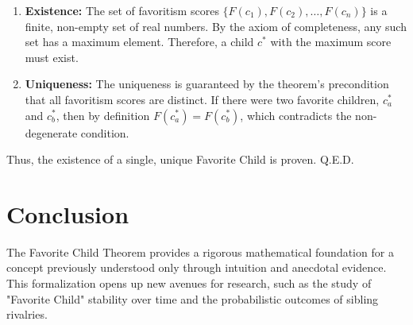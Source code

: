 \documentclass[12pt]{article}
\begin{document}
\begin{enumerate}
    \item \textbf{Existence:} The set of favoritism scores \( \{F(c_1), F(c_2), \dots, F(c_n)\} \) is a finite, non-empty set of real numbers. By the axiom of completeness, any such set has a maximum element. Therefore, a child \( c^* \) with the maximum score must exist.
    \item \textbf{Uniqueness:} The uniqueness is guaranteed by the theorem's precondition that all favoritism scores are distinct. If there were two favorite children, \( c_a^* \) and \( c_b^* \), then by definition \( F(c_a^*) = F(c_b^*) \), which contradicts the non-degenerate condition.
\end{enumerate}

Thus, the existence of a single, unique Favorite Child is proven. Q.E.D.

\section{Conclusion}

The Favorite Child Theorem provides a rigorous mathematical foundation for a concept previously understood only through intuition and anecdotal evidence. This formalization opens up new avenues for research, such as the study of "Favorite Child" stability over time and the probabilistic outcomes of sibling rivalries.
\end{document}
